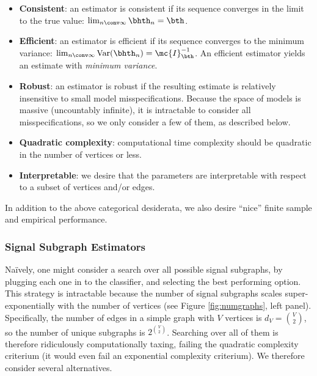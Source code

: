 \documentclass[10pt,journal,cspaper,compsoc]{IEEEtran}
\begin{document}
\begin{itemize}
	\item \textbf{Consistent}: an estimator is consistent if its sequence converges in the limit to the true value: $\lim_{n \conv \infty} \bhth_n = \bth$.  %
	\item \textbf{Efficient}: an estimator is efficient if its sequence converges to the minimum variance: $\lim_{n\conv\infty} \text{Var}(\bhth_n) = \mc{I}_{\bth}^{-1}$.  %
	An efficient estimator yields an estimate with \emph{minimum variance}.
	\item \textbf{Robust}: an estimator is robust if the resulting estimate is relatively insensitive to small model misspecifications.  Because the space of models is massive (uncountably infinite), it is intractable to consider all misspecifications, so we only consider a few of them, as described below.
	\item \textbf{Quadratic complexity}: computational time complexity should be quadratic in the number of vertices or less.
	\item \textbf{Interpretable}: we desire that the parameters are interpretable with respect to a subset of vertices and/or edges.
\end{itemize}
In addition to the above categorical desiderata, we also desire ``nice'' finite sample and empirical performance.


\subsubsection{Signal Subgraph Estimators} %
\label{ssub:subsubsection_name1}


Na\"{i}vely, one might consider a search over all possible signal subgraphs, by plugging each one in to the classifier, and selecting the best performing option.  This strategy is intractable because the number of signal subgraphs scales super-exponentially with the number of vertices (see Figure \ref{fig:numgraphs}, left panel). Specifically, the number of edges in a simple graph with $V$ vertices is $d_V=\binom{V}{2}$, so the number of unique subgraphs is $2^{\binom{V}{2}}$.  Searching over all of them is therefore ridiculously computationally taxing, failing the quadratic complexity criterium (it would even fail an exponential complexity criterium). %
We therefore consider several alternatives.
\end{document}
